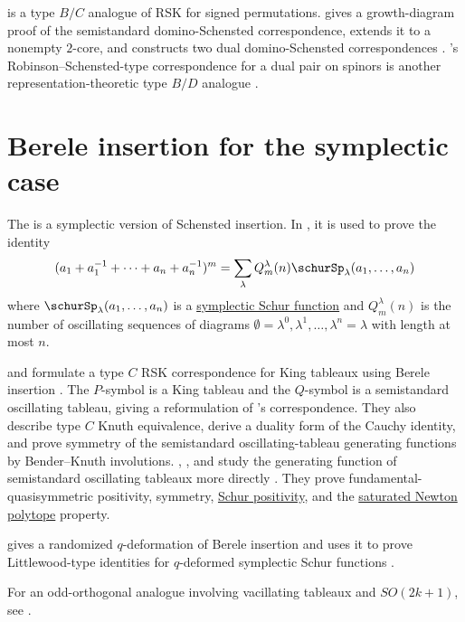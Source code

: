 \label{dominoInsertion} is a type $B/C$ analogue of
RSK for signed permutations.   gives a growth-diagram proof
of the
semistandard domino-Schensted correspondence, extends it to a nonempty
$2$-core, and constructs two dual domino-Schensted correspondences
\cite{Lam2004Domino}.  's Robinson--Schensted-type
correspondence for a dual pair on spinors is another representation-theoretic
type $B/D$ analogue \cite{Terada1993}.


\section[bereleRSK]{Berele insertion for the symplectic case}


The \label{bereleInsertion} is a symplectic version of
Schensted insertion.
In \cite{Berele1986}, it is used to prove the identity
\[
(a_1+ a_1^{-1} + \dotsb + a_n + a_n^{-1})^m
=
\sum_{\lambda} Q^\lambda_m(n)\schurSp_\lambda(a_1,\dotsc,a_n)
\]
where $\schurSp_\lambda(a_1,\dotsc,a_n)$ is a
\hyperref[schurSymplectic]{symplectic Schur function} and $Q^\lambda_m(n)$
is the number of oscillating sequences of diagrams
$\emptyset = \lambda^0,\lambda^1,\dotsc,\lambda^n = \lambda$ with length at
most $n$.

 and  formulate a type $C$ RSK
correspondence for King tableaux using Berele insertion
\cite{KobayashiMatsumura2026}.  The $P$-symbol is a King tableau and the
$Q$-symbol is a semistandard oscillating tableau, giving a reformulation of
's correspondence.  They also describe type $C$ Knuth
equivalence, derive a duality form of the Cauchy identity, and prove symmetry
of the semistandard oscillating-tableau generating functions by Bender--Knuth
involutions.
, , and 
study the generating function of semistandard oscillating tableaux more
directly \cite{KobayashiMatsumuraSugimoto2026x}.  They prove
fundamental-quasisymmetric positivity, symmetry,
\hyperref[schurPositiveDefinition]{Schur positivity}, and the
\hyperref[SNP]{saturated Newton polytope} property.


 gives a randomized $q$-deformation of Berele insertion and
uses it to prove Littlewood-type identities for $q$-deformed symplectic Schur
functions \cite{Nteka2018}.

For an odd-orthogonal analogue involving vacillating tableaux and $SO(2k+1)$,
see \cite{Jagenteufel2019SundaramSO}.


